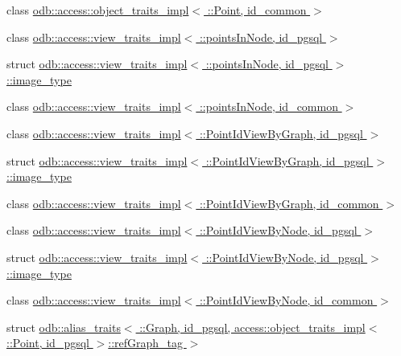 \begin{DoxyCompactItemize}
class \hyperlink{classodb_1_1access_1_1object__traits__impl_3_01_1_1_point_00_01id__common_01_4}{odb\+::access\+::object\+\_\+traits\+\_\+impl$<$ \+::\+Point, id\+\_\+common $>$}
\item 
class \hyperlink{classodb_1_1access_1_1view__traits__impl_3_01_1_1points_in_node_00_01id__pgsql_01_4}{odb\+::access\+::view\+\_\+traits\+\_\+impl$<$ \+::points\+In\+Node, id\+\_\+pgsql $>$}
\item 
struct \hyperlink{structodb_1_1access_1_1view__traits__impl_3_01_1_1points_in_node_00_01id__pgsql_01_4_1_1image__type}{odb\+::access\+::view\+\_\+traits\+\_\+impl$<$ \+::points\+In\+Node, id\+\_\+pgsql $>$\+::image\+\_\+type}
\item 
class \hyperlink{classodb_1_1access_1_1view__traits__impl_3_01_1_1points_in_node_00_01id__common_01_4}{odb\+::access\+::view\+\_\+traits\+\_\+impl$<$ \+::points\+In\+Node, id\+\_\+common $>$}
\item 
class \hyperlink{classodb_1_1access_1_1view__traits__impl_3_01_1_1_point_id_view_by_graph_00_01id__pgsql_01_4}{odb\+::access\+::view\+\_\+traits\+\_\+impl$<$ \+::\+Point\+Id\+View\+By\+Graph, id\+\_\+pgsql $>$}
\item 
struct \hyperlink{structodb_1_1access_1_1view__traits__impl_3_01_1_1_point_id_view_by_graph_00_01id__pgsql_01_4_1_1image__type}{odb\+::access\+::view\+\_\+traits\+\_\+impl$<$ \+::\+Point\+Id\+View\+By\+Graph, id\+\_\+pgsql $>$\+::image\+\_\+type}
\item 
class \hyperlink{classodb_1_1access_1_1view__traits__impl_3_01_1_1_point_id_view_by_graph_00_01id__common_01_4}{odb\+::access\+::view\+\_\+traits\+\_\+impl$<$ \+::\+Point\+Id\+View\+By\+Graph, id\+\_\+common $>$}
\item 
class \hyperlink{classodb_1_1access_1_1view__traits__impl_3_01_1_1_point_id_view_by_node_00_01id__pgsql_01_4}{odb\+::access\+::view\+\_\+traits\+\_\+impl$<$ \+::\+Point\+Id\+View\+By\+Node, id\+\_\+pgsql $>$}
\item 
struct \hyperlink{structodb_1_1access_1_1view__traits__impl_3_01_1_1_point_id_view_by_node_00_01id__pgsql_01_4_1_1image__type}{odb\+::access\+::view\+\_\+traits\+\_\+impl$<$ \+::\+Point\+Id\+View\+By\+Node, id\+\_\+pgsql $>$\+::image\+\_\+type}
\item 
class \hyperlink{classodb_1_1access_1_1view__traits__impl_3_01_1_1_point_id_view_by_node_00_01id__common_01_4}{odb\+::access\+::view\+\_\+traits\+\_\+impl$<$ \+::\+Point\+Id\+View\+By\+Node, id\+\_\+common $>$}
\item 
struct \hyperlink{structodb_1_1alias__traits_3_01_1_1_graph_00_01id__pgsql_00_01access_1_1object__traits__impl_3_031ce39b3df44385fcc4600d018caae95}{odb\+::alias\+\_\+traits$<$ \+::\+Graph, id\+\_\+pgsql, access\+::object\+\_\+traits\+\_\+impl$<$ \+::\+Point, id\+\_\+pgsql $>$\+::ref\+Graph\+\_\+tag $>$}

\end{DoxyCompactItemize}
